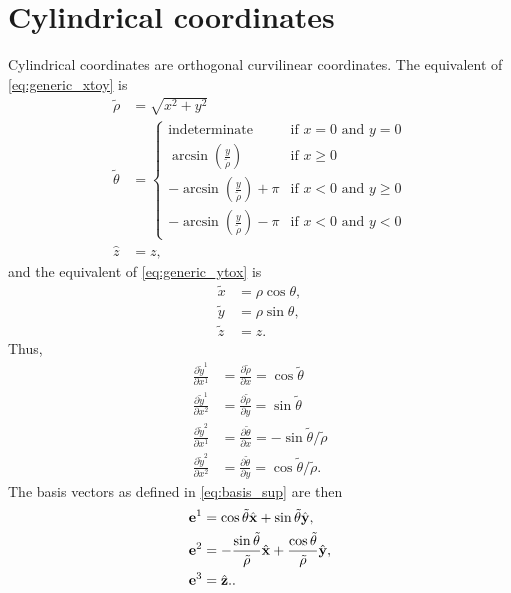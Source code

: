 \documentclass[11pt]{article}
\newcommand{\xtilde}{\tilde{x}}
\newcommand{\ytilde}{\tilde{y}}
\newcommand{\ztilde}{\tilde{z}}
\newcommand{\rhotilde}{\tilde{\rho}}
\newcommand{\thetatilde}{\tilde{\theta}}
\begin{document}
\section{Cylindrical coordinates}
Cylindrical coordinates are orthogonal curvilinear coordinates. The equivalent of \cref{eq:generic_xtoy} is
\begin{align}
    \rhotilde &= \sqrt{x^2 + y^2} \\
    \thetatilde &= {\begin{cases}{\text{indeterminate}}&{\text{if }}x=0{\text{ and }}y=0\\\arcsin \left({\frac {y}{\rhotilde }}\right)&{\text{if }}x\geq 0\\-\arcsin \left({\frac {y}{\rhotilde }}\right)+\pi &{\mbox{if }}x<0{\text{ and }}y\geq 0\\-\arcsin \left({\frac {y}{\rhotilde }}\right)-\pi &{\mbox{if }}x<0{\text{ and }}y<0\end{cases}} \\
    \hat{z} & = z,
\end{align}
and the equivalent of \cref{eq:generic_ytox} is 
\begin{align}
    \xtilde &= \rho \cos \theta, \\
    \ytilde &= \rho \sin \theta, \\
    \ztilde &= z.
\end{align}
Thus, 
\begin{align}
    \frac{\partial \ytilde^1}{\partial x^1} &= \frac{\partial \rhotilde}{\partial x} = \cos \thetatilde \\
    \frac{\partial \ytilde^1}{\partial x^2} &= \frac{\partial \rhotilde}{\partial y} = \sin \thetatilde \\
    \frac{\partial \ytilde^2}{\partial x^1} &= \frac{\partial \thetatilde}{\partial x} = -\sin \thetatilde / \rhotilde \\
    \frac{\partial \ytilde^2}{\partial x^2} &= \frac{\partial \thetatilde}{\partial y} = \cos \thetatilde / \rhotilde.
\end{align}
The basis vectors as defined in \cref{eq:basis_sup} are then 
\begin{align}
    \evec^{1} &= \cos \thetatilde \hat{\xvec} + \sin \thetatilde \hat{\yvec}, \label{eq:cyl_e1}\\
    \evec^{2} &= -\frac{\sin \thetatilde}{\rhotilde} \hat{\xvec} + \frac{\cos \thetatilde}{\rhotilde} \hat{\yvec}, \label{eq:cyl_e2} \\
    \evec^{3} &= \hat{\zvec}. \label{eq:cyl_3}.
\end{align}
\end{document}
